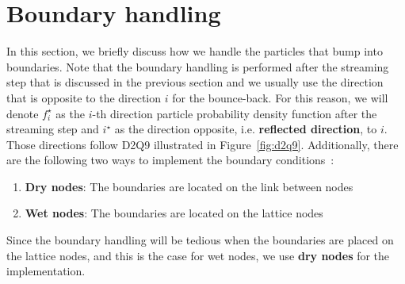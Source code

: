 \section{Boundary handling}
In this section, we briefly discuss how we handle
the particles that bump into boundaries.
Note that the boundary handling is performed
after the streaming step that is discussed in the previous section
and we usually use the direction that is opposite to
the direction $i$ for the bounce-back.
For this reason, we will denote
$f^\star_i$ as the $i$-th direction
particle probability density function
after the streaming step
and $i^\star$ as the direction opposite,
i.e. {\bf reflected direction}, to $i$.
Those directions follow D2Q9 illustrated
in Figure~\ref{fig:d2q9}.
Additionally, there are the following
two ways to
implement the boundary conditions~\cite{liu2014lattice}:
\begin{enumerate}
  \item {\bf Dry nodes}:
  The boundaries are located on the link between nodes
  \item {\bf Wet nodes}:
  The boundaries are located on the lattice nodes
\end{enumerate}
Since the boundary handling will be tedious when
the boundaries are placed on the lattice nodes,
and this is the case for wet nodes,
we use {\bf dry nodes} for the implementation.

